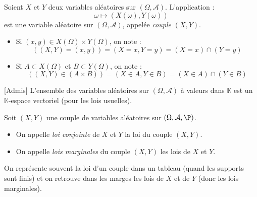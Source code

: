 \documentclass[french,11pt,twoside]{VcCours}
\begin{document}
\begin{TheoremeDefinition}{} Soient $X$ et $Y$ deux variables aléatoires sur $(\Omega, \mathcal{A})$. L'application :
$$ \omega \mapsto (X(\omega), Y(\omega))$$
est une variable aléatoire sur $(\Omega, \mathcal{A})$, appelée \emph{couple} $(X,Y)$.
\end{TheoremeDefinition}{}

\begin{Demonstration}{}

\vspace{5cm}
\end{Demonstration}

\begin{Notation}{}
\begin{itemize}
\item Si $(x,y) \in X(\Omega) \times Y(\Omega)$, on note :
$$ ((X,Y)=(x,y))= (X=x,Y=y) = (X=x) \cap (Y=y)$$
\item Si $A \subset X(\Omega)$ et $B \subset Y(\Omega)$, on note :
$$ ((X,Y) \in (A \times B)) = (X \in A, Y \in B)= (X \in A) \cap (Y \in B)$$
\end{itemize}
\end{Notation}

\begin{Corollaire}{}[Admis] L'ensemble des variables aléatoires sur $(\Omega, \mathcal{A})$ à valeurs dans $\mathbb{K}$ est un $\mathbb{K}$-espace vectoriel (pour les lois usuelles).
\end{Corollaire}

%

\begin{Definition}{} Soit $(X,Y)$ une couple de variables aléatoires sur $(\Omega, \mathcal{A}, \P)$. 
\begin{itemize}
\item On appelle \emph{loi conjointe} de $X$ et $Y$ la loi du couple $(X,Y)$.
\item On appelle \emph{lois marginales} du couple $(X,Y)$ les lois de $X$ et $Y$.
\end{itemize}
\end{Definition}

\begin{Remarque}{} On représente souvent la loi d'un couple dans un tableau (quand les supports sont finis) et on retrouve dans les marges les lois de $X$ et de $Y$ (donc les lois marginales).
\end{Remarque}
\end{document}
